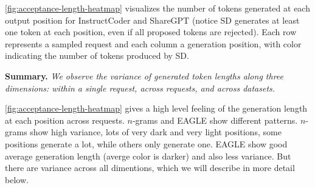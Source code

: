 \documentclass{article}
\begin{document}
\autoref{fig:acceptance-length-heatmap} visualizes the number of tokens generated at each output position for InstructCoder and ShareGPT (notice SD generates at least one token at each position, even if all proposed tokens are rejected). Each row represents a sampled request and each column a generation position, with color indicating the number of tokens produced by SD. 

\begin{quoting}[leftmargin=1.5em, rightmargin=1.5em, vskip=0pt]
\textbf{Summary.}
\emph{We observe the variance of generated token lengths along three dimensions: within a single request, across requests, and across datasets.}
\end{quoting}
\autoref{fig:acceptance-length-heatmap} gives a high level feeling of the generation length at each position across requests. $n$-grams and EAGLE show different patterns. $n$-grams show high variance, lots of very dark and very light positions, some positions generate a lot, while others only generate one. EAGLE show good average generation length (averge color is darker) and also less variance. But there are variance across all dimentions, which we will describe in more detail below. 



\end{document}
